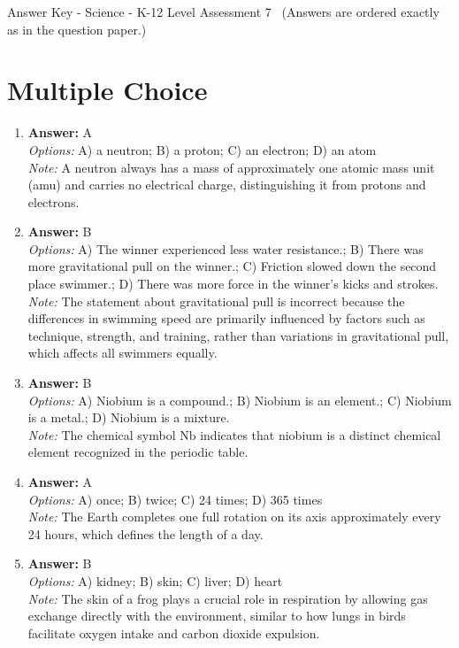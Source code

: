 \documentclass[12pt]{article}
\begin{document}
\begin{center}
Answer Key - Science - K-12 Level Assessment 7 \
\small (Answers are ordered exactly as in the question paper.)
\end{center}

\section*{Multiple Choice}
\begin{enumerate}[label=\arabic*.]
\item \textbf{Answer:} A
\\ \textit{Options:} A) a neutron; B) a proton; C) an electron; D) an atom
\\ \textit{Note:} A neutron always has a mass of approximately one atomic mass unit (amu) and carries no electrical charge, distinguishing it from protons and electrons.
\item \textbf{Answer:} B
\\ \textit{Options:} A) The winner experienced less water resistance.; B) There was more gravitational pull on the winner.; C) Friction slowed down the second place swimmer.; D) There was more force in the winner's kicks and strokes.
\\ \textit{Note:} The statement about gravitational pull is incorrect because the differences in swimming speed are primarily influenced by factors such as technique, strength, and training, rather than variations in gravitational pull, which affects all swimmers equally.
\item \textbf{Answer:} B
\\ \textit{Options:} A) Niobium is a compound.; B) Niobium is an element.; C) Niobium is a metal.; D) Niobium is a mixture.
\\ \textit{Note:} The chemical symbol Nb indicates that niobium is a distinct chemical element recognized in the periodic table.
\item \textbf{Answer:} A
\\ \textit{Options:} A) once; B) twice; C) 24 times; D) 365 times
\\ \textit{Note:} The Earth completes one full rotation on its axis approximately every 24 hours, which defines the length of a day.
\item \textbf{Answer:} B
\\ \textit{Options:} A) kidney; B) skin; C) liver; D) heart
\\ \textit{Note:} The skin of a frog plays a crucial role in respiration by allowing gas exchange directly with the environment, similar to how lungs in birds facilitate oxygen intake and carbon dioxide expulsion.
\end{enumerate}
\end{document}
